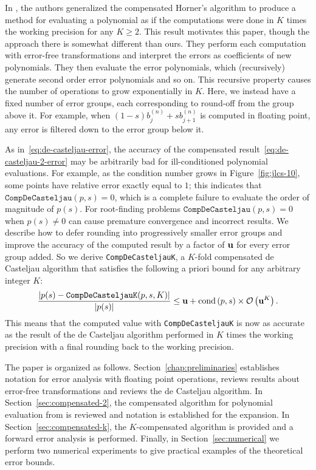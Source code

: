 In \cite{Graillat2009}, the authors generalized the compensated Horner's
algorithm to produce a method for evaluating a polynomial as if
the computations were done in \(K\) times the working precision for
any \(K \geq 2\). This result motivates this paper, though the
approach there is somewhat different than ours. They perform each computation
with error-free transformations and interpret the errors as coefficients of new
polynomials. They then evaluate the error polynomials, which (recursively)
generate second order error polynomials and so on. This recursive property
causes the number of operations to grow exponentially in \(K\). Here, we
instead have a fixed number of error groups, each corresponding to round-off
from the group above it. For example, when
\((1 - s) b_j^{(n)} + s b_{j + 1}^{(n)}\) is computed in floating point, any
error is filtered down to the error group below it.

As in~\eqref{eq:de-casteljau-error}, the accuracy of the compensated
result~\eqref{eq:de-casteljau-2-error} may be arbitrarily bad for
ill-conditioned
polynomial evaluations. For example, as the condition number grows in
Figure~\ref{fig:jlcs-10}, some points have relative error exactly equal to
\(1\); this indicates that \\ \(\mathtt{CompDeCasteljau}(p, s) = 0\), which is
a complete failure to evaluate the order of magnitude of \(p(s)\). For
root-finding problems \(\mathtt{CompDeCasteljau}(p, s) = 0\) when
\(p(s) \neq 0\) can cause premature convergence and incorrect results.
We describe how to defer rounding into progressively
smaller error groups and improve the accuracy of the computed result by a
factor of \(\mathbf{u}\) for every error group added. So we derive
\texttt{CompDeCasteljauK}, a \(K\)-fold compensated de Casteljau algorithm
that satisfies the following a priori bound for any arbitrary integer \(K\):
\begin{equation}
  \frac{\left|p(s) - \mathtt{CompDeCasteljauK}(p, s, K)\right|}{
    \left|p(s)\right|} \leq \mathbf{u} + \operatorname{cond}\left(p, s\right) \times
    \mathcal{O}\left(\mathbf{u}^K\right).
\end{equation}
This means that the computed value with \texttt{CompDeCasteljauK} is now
as accurate as the result of the de Casteljau algorithm performed in
\(K\) times the working precision with a final rounding back to the
working precision.

The paper is organized as follows. Section~\ref{chap:preliminaries} establishes
notation for error analysis with floating point operations, reviews
results about error-free transformations and reviews the
de Casteljau algorithm. In Section~\ref{sec:compensated-2},
the compensated algorithm for polynomial evaluation from \cite{Jiang2010} is
reviewed and notation is established for the expansion. In
Section~\ref{sec:compensated-k}, the \(K\)-compensated algorithm is provided
and a forward error analysis is performed. Finally, in
Section~\ref{sec:numerical} we perform two numerical experiments to
give practical examples of the theoretical error bounds.

